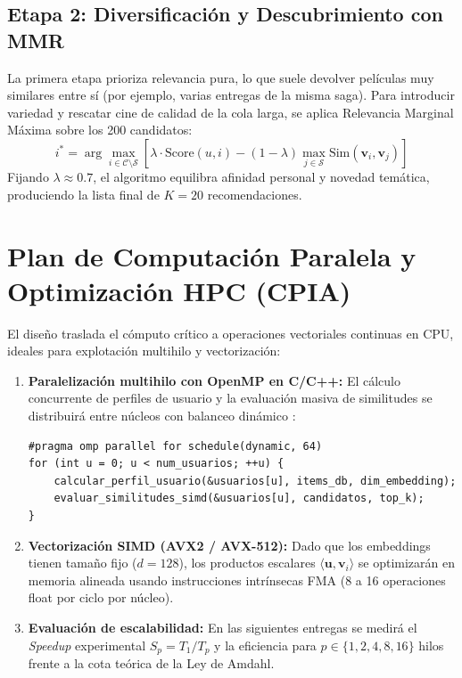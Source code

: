 \documentclass[a4paper,11pt]{article}
\begin{document}
\subsection{Etapa 2: Diversificación y Descubrimiento con MMR}
La primera etapa prioriza relevancia pura, lo que suele devolver películas muy similares entre sí (por ejemplo, varias entregas de la misma saga). Para introducir variedad y rescatar cine de calidad de la cola larga, se aplica Relevancia Marginal Máxima \cite{carbonell1998} sobre los 200 candidatos:
\begin{equation}
    i^* = \arg\max_{i \in \mathcal{C} \setminus \mathcal{S}} \left[ \lambda \cdot \text{Score}(u, i) - (1 - \lambda) \max_{j \in \mathcal{S}} \text{Sim}(\mathbf{v}_i, \mathbf{v}_j) \right]
    \label{eq:mmr}
\end{equation}
Fijando $\lambda \approx 0.7$, el algoritmo equilibra afinidad personal y novedad temática, produciendo la lista final de $K = 20$ recomendaciones.

\section{Plan de Computación Paralela y Optimización HPC (CPIA)}

El diseño traslada el cómputo crítico a operaciones vectoriales continuas en CPU, ideales para explotación multihilo y vectorización:

\begin{enumerate}
    \item \textbf{Paralelización multihilo con OpenMP en C/C++:} El cálculo concurrente de perfiles de usuario y la evaluación masiva de similitudes se distribuirá entre núcleos con balanceo dinámico \cite{openmp}:
\begin{lstlisting}
#pragma omp parallel for schedule(dynamic, 64)
for (int u = 0; u < num_usuarios; ++u) {
    calcular_perfil_usuario(&usuarios[u], items_db, dim_embedding);
    evaluar_similitudes_simd(&usuarios[u], candidatos, top_k);
}
\end{lstlisting}
    \item \textbf{Vectorización SIMD (AVX2 / AVX-512):} Dado que los embeddings tienen tamaño fijo ($d = 128$), los productos escalares $\langle \mathbf{u}, \mathbf{v}_i \rangle$ se optimizarán en memoria alineada usando instrucciones intrínsecas FMA (8 a 16 operaciones float por ciclo por núcleo).
    \item \textbf{Evaluación de escalabilidad:} En las siguientes entregas se medirá el \textit{Speedup} experimental $S_p = T_1 / T_p$ y la eficiencia para $p \in \{1, 2, 4, 8, 16\}$ hilos frente a la cota teórica de la Ley de Amdahl.
\end{enumerate}
\end{document}
